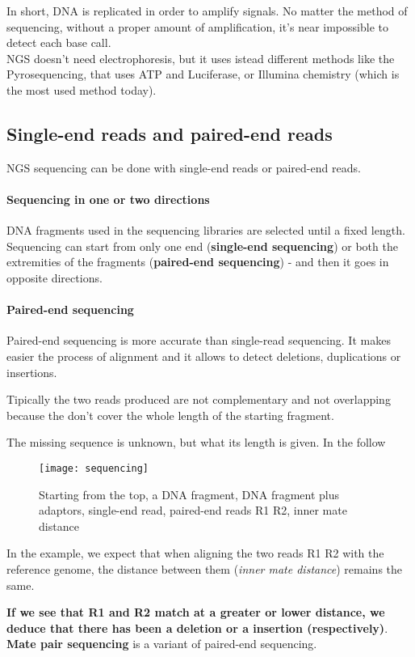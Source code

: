 In short, DNA is replicated in order to amplify signals. No matter the method of sequencing, without a proper amount of amplification, it's near impossible to detect each base call. \\

NGS doesn't need electrophoresis, but it uses istead different methods
like the Pyrosequencing, that uses ATP and Luciferase, or Illumina
chemistry (which is the most used method today).

\subsection{Single-end reads and paired-end reads}

NGS sequencing can be done with single-end reads or paired-end reads.

\paragraph*{Sequencing in one or two directions}

DNA fragments used in the sequencing libraries are selected until a fixed
length.
Sequencing can start from only one end (\textbf{single-end sequencing})
or both the extremities of the fragments (\textbf{paired-end sequencing})
- and then it goes in opposite directions.

\paragraph*{Paired-end sequencing}
Paired-end sequencing is more accurate than single-read sequencing.
It makes easier the process of alignment and it allows to detect deletions,
duplications or insertions.

Tipically the two reads produced are not complementary and not overlapping
because the don't cover the whole length of the starting fragment. 

The missing sequence is unknown, but what its length is given.
In the follow

\begin{figure}[H]
  \centering
  \texttt{[image: sequencing]}
  \caption{Starting from the top, a DNA fragment, DNA fragment plus adaptors, single-end read, paired-end reads R1 R2, inner mate distance}
  \label{fig:sequencing}
\end{figure}

In the example, we expect that when aligning the two reads R1 R2 with the
reference genome, the distance between them (\textit{inner mate distance})
remains the same.

\textbf{If we see that R1 and R2 match at a greater or lower distance, we
deduce that there has been a deletion or a insertion (respectively)}.\\

\textbf{Mate pair sequencing} is a variant of paired-end sequencing.

